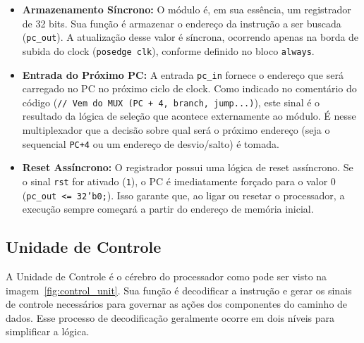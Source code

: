 \documentclass[12pt]{article}
\begin{document}
\begin{itemize}
    \item \textbf{Armazenamento Síncrono:} O módulo é, em sua essência, um registrador de 32 bits. Sua função é armazenar o endereço da instrução a ser buscada (\texttt{pc\_out}). A atualização desse valor é síncrona, ocorrendo apenas na borda de subida do clock (\texttt{posedge clk}), conforme definido no bloco \texttt{always}.

    \item \textbf{Entrada do Próximo PC:} A entrada \texttt{pc\_in} fornece o endereço que será carregado no PC no próximo ciclo de clock. Como indicado no comentário do código (\texttt{// Vem do MUX (PC + 4, branch, jump...)}), este sinal é o resultado da lógica de seleção que acontece externamente ao módulo. É nesse multiplexador que a decisão sobre qual será o próximo endereço (seja o sequencial \texttt{PC+4} ou um endereço de desvio/salto) é tomada.

    \item \textbf{Reset Assíncrono:} O registrador possui uma lógica de reset assíncrono. Se o sinal \texttt{rst} for ativado (\texttt{1}), o PC é imediatamente forçado para o valor 0 (\texttt{pc\_out <= 32'b0;}). Isso garante que, ao ligar ou resetar o processador, a execução sempre começará a partir do endereço de memória inicial.
\end{itemize}

\subsection{Unidade de Controle}
A Unidade de Controle é o cérebro do processador como pode ser visto na imagem~\ref{fig:control_unit}. Sua função é decodificar a instrução e gerar os sinais de controle necessários para governar as ações dos componentes do caminho de dados. Esse processo de decodificação geralmente ocorre em dois níveis para simplificar a lógica.
\end{document}
